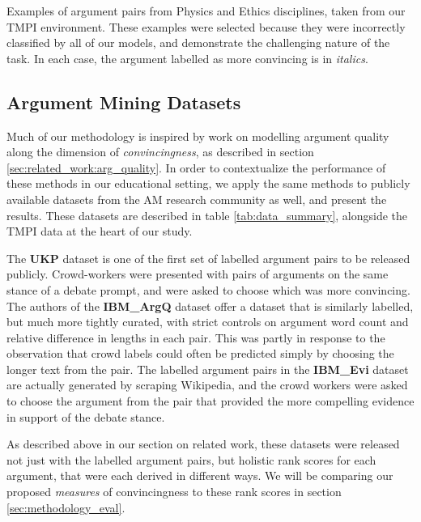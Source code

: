 \documentclass[notitlepage,12pt]{jedm}
\begin{document}
\begin{table}
	\caption{
		Examples of argument pairs from Physics and Ethics disciplines, taken 
		from our TMPI environment. 
		These examples were selected because they were incorrectly classified 
		by all of our models, and demonstrate the challenging nature of the 
		task. 
		In each case, the argument labelled as more convincing is in 
		\textit{italics}.}
	\label{tab:sample_obs_dalite}
	\begin{subtable}[t]{\textwidth}
		
	\end{subtable}
	\begin{subtable}[t]{\textwidth}
	
	\end{subtable}
\end{table}


\subsection{Argument Mining Datasets}
Much of our methodology is inspired by work on modelling argument quality along 
the dimension of \textit{convincingness}, as described in section 
\ref{sec:related_work:arg_quality}. 
In order to contextualize the performance of these methods in our educational 
setting, we apply the same methods to publicly available datasets from the 
AM research community as well, and present the results. 
These datasets are described in table \ref{tab:data_summary}, alongside the 
TMPI data at the heart of our study. 

The \textbf{UKP} dataset \cite{habernal_which_2016} is one of the first set of 
labelled argument pairs to be released publicly.
Crowd-workers were presented with pairs of arguments on the same stance of a 
debate prompt, and were asked to choose which was more convincing.
The authors of the \textbf{IBM\_ArgQ} dataset \cite{toledo_automatic_2019} 
offer a dataset that is similarly labelled, but much more tightly curated, with 
strict controls on argument word count and relative difference in lengths in 
each pair.
This was partly in response to the observation that crowd labels could often be 
predicted simply by choosing the longer text from the pair.
The labelled argument pairs in the \textbf{IBM\_Evi} dataset 
\cite{gleize_are_2019} are actually generated by scraping Wikipedia, and the 
crowd workers were asked to choose the argument from the pair that provided the 
more compelling evidence in support of the debate stance.

As described above in our section on related work, these datasets were released 
not just with the labelled argument pairs, but holistic rank scores for each 
argument, that were each derived in different ways. 
We will be comparing our proposed \textit{measures} of convincingness to these 
rank scores in section \ref{sec:methodology_eval}.
\end{document}
